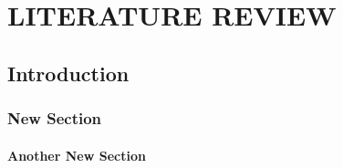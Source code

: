 \chapter{\textbf{LITERATURE REVIEW}} \label{Litrev}

\section{Introduction}

\lipsum[1]

\subsection{New Section}

\lipsum[1]

\subsubsection{Another New Section}

\lipsum[1] \cite{Hoffstein2008a}


